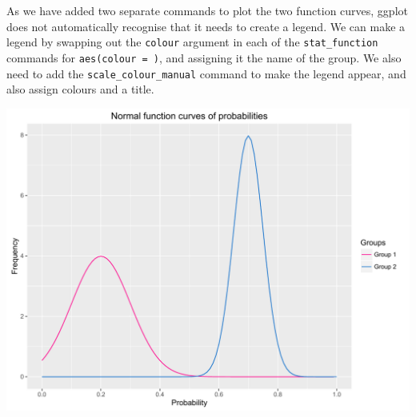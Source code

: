 As we have added two separate commands to plot the two function curves,
ggplot does not automatically recognise that it needs to create a
legend. We can make a legend by swapping out the \texttt{colour}
argument in each of the \texttt{stat\_function} commands for
\texttt{aes(colour\ =\ )}, and assigning it the name of the group. We
also need to add the \texttt{scale\_colour\_manual} command to make the
legend appear, and also assign colours and a title.

\begin{Shaded}
\begin{Highlighting}[]
\StringTok{ }\NormalTok{(}\NormalTok{(} \NormalTok{(}\NormalTok{, }\NormalTok{)), }\NormalTok{(} 
\StringTok{      }\NormalTok{(}  \NormalTok{(}\NormalTok{, }\NormalTok{),}
\StringTok{      }\NormalTok{(} \NormalTok{)) +}
\StringTok{      }\NormalTok{(}  \NormalTok{(}\NormalTok{, }\NormalTok{),}
\StringTok{      }\NormalTok{(} \NormalTok{)) +}
\StringTok{      }\NormalTok{(} \NormalTok{,} \NormalTok{(}\NormalTok{, }\NormalTok{, }\NormalTok{),}
\StringTok{        }\NormalTok{(}\NormalTok{, }\NormalTok{)) +}
\StringTok{      }\NormalTok{(} \NormalTok{) +}
\StringTok{      }\NormalTok{(}\NormalTok{) +}
\StringTok{      }\NormalTok{(}\NormalTok{, } \NormalTok{(}\NormalTok{, }\NormalTok{))}
\end{Highlighting}
\end{Shaded}

\begin{center}\includegraphics[width=0.55\linewidth]{figures/function_10-1} \end{center}


